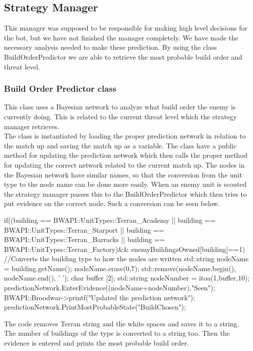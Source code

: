 	\subsection{Strategy Manager}
		This manager was supposed to be responsible for making high level decisions for the bot, but we have not finished the manager completely. We have made the necessary analysis needed to make these prediction. By using the class BuildOrderPredictor we are able to retrieve the most 
		probable build order and threat level.
		
		\subsubsection{Build Order Predictor class}
			This class uses a Bayesian network to analyze what build order the enemy is currently doing. This is related to the current threat level which
			the strategy manager retrieves. \\
			
			The class is instantiated by loading the proper prediction network in relation to the match up and saving the match up as a variable. 
			The class have a public method for updating the prediction network which then calls the proper method for updating the correct network related 
			to the current match up. The nodes in the Bayesian network have similar names, so that the conversion from the unit type to the node name can be 
			done more easily. When an enemy unit is scouted the strategy manager passes this to the BuildOrderPredictor which then tries to put evidence 
			on the correct node. Such a conversion can be seen below.
			\begin{Sourcecode}[caption=Conversion from unit type to node name]		
	if((building == BWAPI::UnitTypes::Terran_Academy || 
			building == BWAPI::UnitTypes::Terran_Starport ||
			building == BWAPI::UnitTypes::Terran_Barracks ||
			building == BWAPI::UnitTypes::Terran_Factory)&& 
			enemyBuildingsOwned[building]==1)
	{
		//Converts the building type to how the nodes are written
		std::string nodeName = building.getName();
		nodeName.erase(0,7);
		std::remove(nodeName.begin(), nodeName.end(), ' ');
		char buffer [2];
		std::string nodeNumber = itoa(1,buffer,10);	
		predictionNetwork.EnterEvidence((nodeName+nodeNumber),"Seen");
		BWAPI::Broodwar->printf("Updated the prediction network");
		predictionNetwork.PrintMostProbableState("BuildChosen");
	}
			\end{Sourcecode}
			 The code removes Terran string and the white spaces and saves it to a string. The number of buildings of the type is converted to a string too. 
			 Then the evidence is entered and prints the most probable build order.
